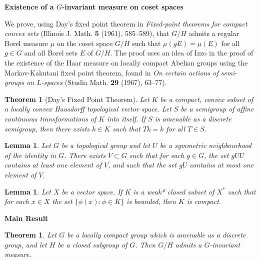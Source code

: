 \documentclass[landscape]{slides}
\newtheorem{theorem}[defn]{Theorem}
\newtheorem{lemma}[defn]{Lemma}
\begin{document}
\begin{slide}
{\bf Existence of a $G$-invariant measure on coset spaces}

We prove, using Day's fixed point theorem in
\emph{Fixed-point theorems for compact convex sets} (Illinois J. Math.
  \textbf{5} (1961), 585--589),
that $G/H$ admits a regular Borel measure $\mu$ on the coset space $G/H$ such that $\mu(gE) = 
\mu(E)$ for all $g \in G$ and all Borel sets $E$ of $G/H$.  The proof uses an idea
of Izzo in the proof of the existence of the Haar measure on locally compact
Abelian groups using the Markov-Kakutani fixed point theorem, found in
\emph{On certain actions of semi-groups on ${L}$-spaces} (Studia
  Math. \textbf{29} (1967), 63--77).
\end{slide}

\begin{slide}
\begin{theorem}[Day's Fixed Point Theorem]
Let $K$ be a compact, convex subset of a locally convex Hausdorff 
topological vector space.  Let $S$ be a semigroup of affine continuous 
transformations of $K$ into itself.  If $S$ is amenable as a discrete 
semigroup, then there exists $k \in K$ such that $Tk=k$ for all $T 
\in S$.\\
\end{theorem}

\begin{lemma}\label{ginv:1}
Let $G$ be a topological group and let $U$ be a symmetric neighbourhood of 
the identity in $G$.  There exists $V \subset G$ such that for 
each $g \in G$, the set $gUU$ contains at least one element of 
$V$, and such that the set $gU$ contains at most one element of $V$.\\
\end{lemma}

\begin{lemma}\label{ginv:2}
Let $X$ be a vector space.
If $K$ is a weak* closed subset of $X^*$ such that for each $x \in X$ the set 
$\{\phi(x):\phi\in K\}$ is bounded, then $K$ is compact.
\end{lemma}
\end{slide}

\begin{slide}
{\bf Main Result}\\
\begin{theorem}\label{coset}
Let $G$ be a locally compact group which is amenable as a discrete group,
and let $H$ be a closed subgroup of $G$.  Then $G/H$ admits a $G$-invariant
measure.
\end{theorem}
\end{slide}
\end{document}
